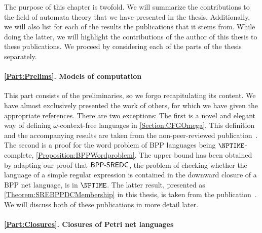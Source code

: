 \documentclass[../../diss.tex]{subfiles}
\begin{document}

The purpose of this chapter is twofold.
We will summarize the contributions to the field of automata theory that we have presented in the thesis.
Additionally, we will also list for each of the results the publications that it stems from.
While doing the latter, we will highlight the contributions of the author of this thesis to these publications.
We proceed by considering each of the parts of the thesis separately.

\paragraph{\cref{Part:Prelims}. Models of computation}

This part consists of the preliminaries, so we forgo recapitulating its content.
We have almost exclusively presented the work of others, for which we have given the appropriate references.
There are two exceptions:
The first is a novel and elegant way of defining $\omega$-context-free languages in \cref{Section:CFGOmega}.
This definition and the accompanying results are taken from the non-peer-reviewed publication~\cite{MeyerMN17a}.
The second is a proof for the word problem of BPP languages being $\NPTIME$-complete, \cref{Proposition:BPPWordproblem}.
The upper bound has been obtained by adapting our proof that $\mathsf{BPP\text{-}SREDC}$, the problem of checking whether the language of a simple regular expression is contained in the downward closure of a BPP net language, is in $\NPTIME$.
The latter result, presented as \cref{Theorem:SREBPPDCMembership} in this thesis, is taken from the publication~\cite{AtigMMS17}.
We will discuss both of these publications in more detail later.

\paragraph{\cref{Part:Closures}. Closures of Petri net languages}
\end{document}
